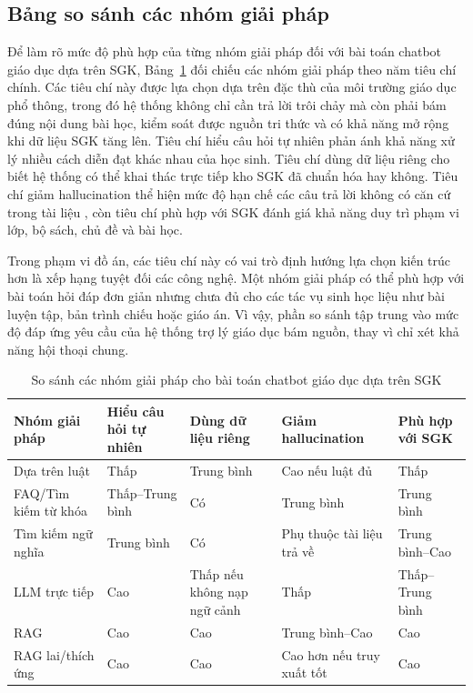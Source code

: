 \documentclass[../DoAn.tex]{subfiles}
\begin{document}
\subsection{Bảng so sánh các nhóm giải pháp}

Để làm rõ mức độ phù hợp của từng nhóm giải pháp đối với bài toán chatbot giáo dục dựa trên SGK, Bảng~\ref{tab:solution-comparison-ch2} đối chiếu các nhóm giải pháp theo năm tiêu chí chính.
Các tiêu chí này được lựa chọn dựa trên đặc thù của môi trường giáo dục phổ thông, trong đó hệ thống không chỉ cần trả lời trôi chảy mà còn phải bám đúng nội dung bài học, kiểm soát được nguồn tri thức và có khả năng mở rộng khi dữ liệu SGK tăng lên. Tiêu chí hiểu câu hỏi tự nhiên phản ánh khả năng xử lý nhiều cách diễn đạt khác nhau của học sinh. Tiêu chí dùng dữ liệu riêng cho biết hệ thống có thể khai thác trực tiếp kho SGK đã chuẩn hóa hay không. Tiêu chí giảm hallucination thể hiện mức độ hạn chế các câu trả lời không có căn cứ trong tài liệu \cite{ji2023hallucination}, còn tiêu chí phù hợp với SGK đánh giá khả năng duy trì phạm vi lớp, bộ sách, chủ đề và bài học.

Trong phạm vi đồ án, các tiêu chí này có vai trò định hướng lựa chọn kiến trúc hơn là xếp hạng tuyệt đối các công nghệ. Một nhóm giải pháp có thể phù hợp với bài toán hỏi đáp đơn giản nhưng chưa đủ cho các tác vụ sinh học liệu như bài luyện tập, bản trình chiếu hoặc giáo án. Vì vậy, phần so sánh tập trung vào mức độ đáp ứng yêu cầu của hệ thống trợ lý giáo dục bám nguồn, thay vì chỉ xét khả năng hội thoại chung.

\begin{table}[H]
\centering
\small
\begin{tabular}{|p{}|p{}|p{}|p{}|p{}|}
\hline
\textbf{Nhóm giải pháp} & \textbf{Hiểu câu hỏi tự nhiên} & \textbf{Dùng dữ liệu riêng} & \textbf{Giảm hallucination} & \textbf{Phù hợp với SGK} \\ \hline
Dựa trên luật & Thấp & Trung bình & Cao nếu luật đủ & Thấp \\ \hline
FAQ/Tìm kiếm từ khóa & Thấp--Trung bình & Có & Trung bình & Trung bình \\ \hline
Tìm kiếm ngữ nghĩa & Trung bình & Có & Phụ thuộc tài liệu trả về & Trung bình--Cao \\ \hline
LLM trực tiếp & Cao & Thấp nếu không nạp ngữ cảnh & Thấp & Thấp--Trung bình \\ \hline
RAG & Cao & Cao & Trung bình--Cao & Cao \\ \hline
RAG lai/thích ứng & Cao & Cao & Cao hơn nếu truy xuất tốt & Cao \\ \hline
\end{tabular}
\caption{So sánh các nhóm giải pháp cho bài toán chatbot giáo dục dựa trên SGK}
\label{tab:solution-comparison-ch2}
\end{table}
\end{document}
